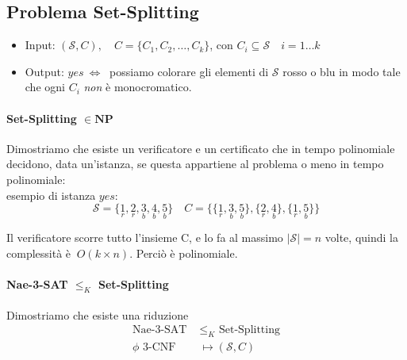 \documentclass[a4paper]{article}
\theoremstyle{definition}
\newcommand{\np}{\mathbf{NP}}
\begin{document}
		\subsection{Problema Set-Splitting}
			\begin{itemize}
				\item Input: $ (\mathcal{S}, C),\quad C = \{C_1, C_2, \dots, C_k \} $, con $ C_i \subseteq \mathcal{S}\quad i = 1\dots k $
				\item Output: $ yes\ \Leftrightarrow\  $ possiamo colorare gli elementi di $ \mathcal{S} $ rosso o blu in modo tale che ogni $ C_i $ \textit{non} è monocromatico.
			\end{itemize}
			
			\paragraph{Set-Splitting $ \in \np $} Dimostriamo che esiste un verificatore e un certificato che in tempo polinomiale decidono, data un'istanza, se questa appartiene al problema o meno in tempo polinomiale:\\
			esempio di istanza $ yes $:
			\[
				\mathcal{S} = \{\underset{r}{1}, \underset{r}{2}, \underset{b}{3}, \underset{b}{4}, \underset{b}{5}\} \quad
				C = \big\lbrace \{\underset{r}{1}, \underset{b}{3}, \underset{b}{5}\}, \{\underset{r}{2}, \underset{b}{4}\}, \{\underset{r}{1}, \underset{b}{5}\} \big\rbrace
			\]
			
			Il verificatore scorre tutto l'insieme C, e lo fa al massimo $ |\mathcal{S}| = n $ volte, quindi la complessità è $ \ O(k\times n) $. Perciò è polinomiale.
			
			\paragraph{Nae-3-SAT $ \leq_K $ Set-Splitting} Dimostriamo che esiste una riduzione
			\begin{align*}
				\text{Nae-3-SAT } & \leq_K \text{ Set-Splitting}\\
				\phi \text{ 3-CNF } & \mapsto (\mathcal{S}, C)
			\end{align*}
			
\end{document}
